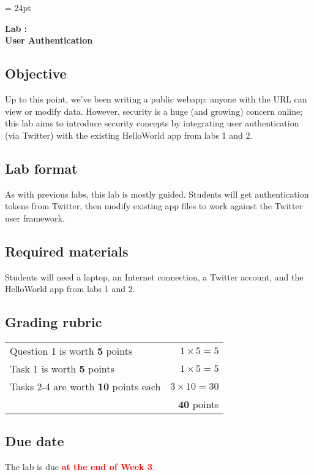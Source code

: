 \documentclass{article}
\newcommand{\labduedate}{at the end of Week 3}
\begin{document}
\chead{\textcolor{Gray}{CSSE491 -- Scalable Computing Lab Assignment}}
\headsep = 24pt

\begin{center}
{ \large
\textbf{Lab \labnumber: \longproductname} \\
\textbf{User Authentication}
}
\end{center}

\subsection*{Objective}
Up to this point, we've been writing a public webapp: anyone with the URL can view or modify data. However, security is a huge (and growing) concern online; this lab aims to introduce security concepts by integrating user authentication (via Twitter) with the existing HelloWorld app from labs 1 and 2.

\subsection*{Lab format}
As with previous labs, this lab is mostly guided. Students will get authentication tokens from Twitter, then modify existing app files to work against the Twitter user framework.

\subsection*{Required materials}
Students will need a laptop, an Internet connection, a Twitter account, and the HelloWorld app from labs 1 and 2.

\subsection*{Grading rubric}
\begin{tabular}{p{5.5in} r}
Question 1 is worth \textbf{5} points & $1 \times 5 = 5$ \\
Task 1 is worth \textbf{5} points & $1 \times 5 = 5$ \\
Tasks 2-4 are worth \textbf{10} points each & $3 \times 10 = 30$ \\ \hline
& \textbf{40} points
\end{tabular}

\subsection*{Due date}
The lab is due \textcolor{red}{\textbf{\labduedate}}.
\end{document}
